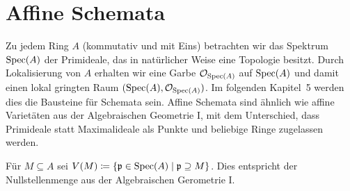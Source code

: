 

\chapter{Affine Schemata}

Zu jedem Ring $A$ (kommutativ und mit Eins) betrachten wir das Spektrum $\operatorname{Spec}(A)$ der Primideale, das in natürlicher Weise eine Topologie besitzt. Durch Lokalisierung von $A$ erhalten wir eine Garbe $\mathcal{O}_{\operatorname{Spec}(A)}$ auf $\operatorname{Spec}(A)$ und damit einen lokal gringten Raum $(\operatorname{Spec}(A),\mathcal{O}_{\operatorname{Spec}(A)})$. Im folgenden Kapitel~5 werden dies die Bausteine für Schemata sein. Affine Schemata sind ähnlich wie affine Varietäten aus der Algebraischen Geometrie I, mit dem Unterschied, dass Primideale statt Maximalideale als Punkte und beliebige Ringe zugelassen werden.

\begin{defn}
	Für $M\subseteq A$ sei $V(M)\coloneqq\{\mathfrak{p} \in \operatorname{Spec}(A) \mid \mathfrak{p} \supseteq M \}$. Dies entspricht der Nullstellenmenge aus der Algebraischen Gerometrie I.
\end{defn}

